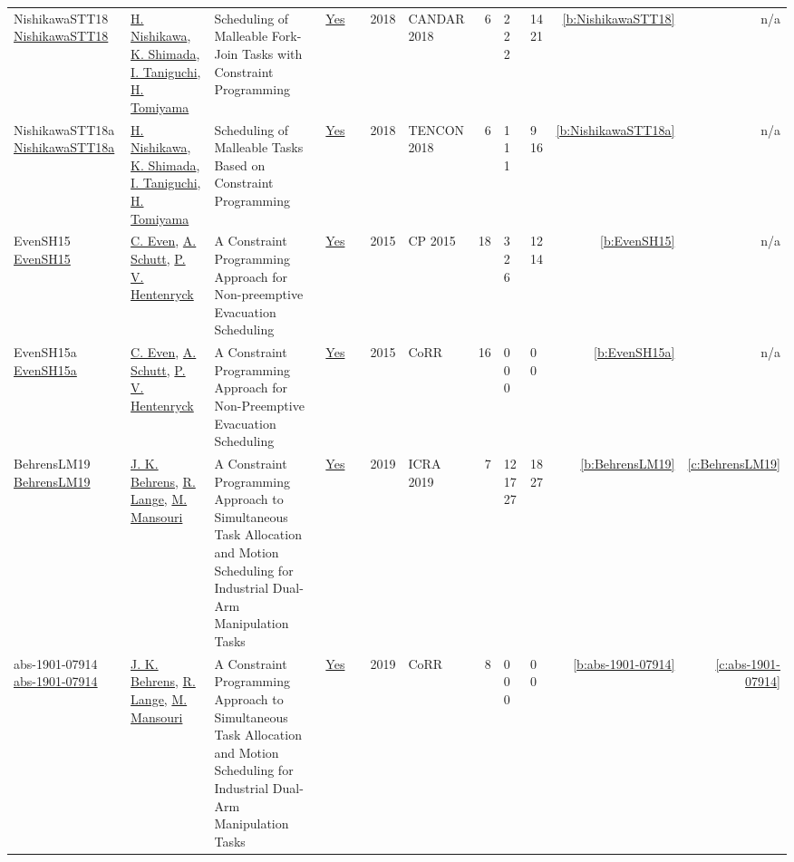 {\begin{longtable}{>{\raggedright\arraybackslash}p{3cm}>{\raggedright\arraybackslash}p{4.5cm}>{\raggedright\arraybackslash}p{6.0cm}rrrp{2.5cm}rp{1cm}p{1cm}rr}
NishikawaSTT18 \href{https://doi.org/10.1109/CANDAR.2018.00025}{NishikawaSTT18} & \hyperref[auth:a531]{H. Nishikawa}, \hyperref[auth:a532]{K. Shimada}, \hyperref[auth:a533]{I. Taniguchi}, \hyperref[auth:a534]{H. Tomiyama} & Scheduling of Malleable Fork-Join Tasks with Constraint Programming & \href{../works/NishikawaSTT18.pdf}{Yes} & \cite{NishikawaSTT18} & 2018 & CANDAR 2018 & 6 & 2 2 2 & 14 21 & \ref{b:NishikawaSTT18} & n/a\\
NishikawaSTT18a \href{https://doi.org/10.1109/TENCON.2018.8650168}{NishikawaSTT18a} & \hyperref[auth:a531]{H. Nishikawa}, \hyperref[auth:a532]{K. Shimada}, \hyperref[auth:a533]{I. Taniguchi}, \hyperref[auth:a534]{H. Tomiyama} & Scheduling of Malleable Tasks Based on Constraint Programming & \href{../works/NishikawaSTT18a.pdf}{Yes} & \cite{NishikawaSTT18a} & 2018 & TENCON 2018 & 6 & 1 1 1 & 9 16 & \ref{b:NishikawaSTT18a} & n/a\\
EvenSH15 \href{https://doi.org/10.1007/978-3-319-23219-5_40}{EvenSH15} & \hyperref[auth:a214]{C. Even}, \hyperref[auth:a124]{A. Schutt}, \hyperref[auth:a148]{P. V. Hentenryck} & \cellcolor{green!10}A Constraint Programming Approach for Non-preemptive Evacuation Scheduling & \href{../works/EvenSH15.pdf}{Yes} & \cite{EvenSH15} & 2015 & CP 2015 & 18 & 3 2 6 & 12 14 & \ref{b:EvenSH15} & n/a\\
EvenSH15a \href{http://arxiv.org/abs/1505.02487}{EvenSH15a} & \hyperref[auth:a214]{C. Even}, \hyperref[auth:a124]{A. Schutt}, \hyperref[auth:a148]{P. V. Hentenryck} & A Constraint Programming Approach for Non-Preemptive Evacuation Scheduling & \href{../works/EvenSH15a.pdf}{Yes} & \cite{EvenSH15a} & 2015 & CoRR & 16 & 0 0 0 & 0 0 & \ref{b:EvenSH15a} & n/a\\
BehrensLM19 \href{https://doi.org/10.1109/ICRA.2019.8794022}{BehrensLM19} & \hyperref[auth:a540]{J. K. Behrens}, \hyperref[auth:a541]{R. Lange}, \hyperref[auth:a542]{M. Mansouri} & \cellcolor{green!10}A Constraint Programming Approach to Simultaneous Task Allocation and Motion Scheduling for Industrial Dual-Arm Manipulation Tasks & \href{../works/BehrensLM19.pdf}{Yes} & \cite{BehrensLM19} & 2019 & ICRA 2019 & 7 & 12 17 27 & 18 27 & \ref{b:BehrensLM19} & \ref{c:BehrensLM19}\\
abs-1901-07914 \href{http://arxiv.org/abs/1901.07914}{abs-1901-07914} & \hyperref[auth:a540]{J. K. Behrens}, \hyperref[auth:a541]{R. Lange}, \hyperref[auth:a542]{M. Mansouri} & A Constraint Programming Approach to Simultaneous Task Allocation and Motion Scheduling for Industrial Dual-Arm Manipulation Tasks & \href{../works/abs-1901-07914.pdf}{Yes} & \cite{abs-1901-07914} & 2019 & CoRR & 8 & 0 0 0 & 0 0 & \ref{b:abs-1901-07914} & \ref{c:abs-1901-07914}\\

\end{longtable}}
